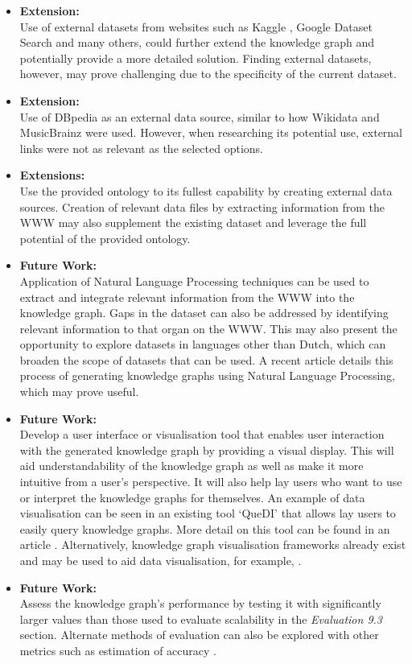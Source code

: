 \begin{itemize}
    \item \textbf{Extension:} \\ Use of external datasets from websites such as Kaggle \cite{kaggle}, Google Dataset Search \cite{googledatasetsearch} and many others, could further extend the knowledge graph and potentially provide a more detailed solution. Finding external datasets, however, may prove challenging due to the specificity of the current dataset. 
    \item \textbf{Extension:} \\ Use of DBpedia \cite{organdbpedia} as an external data source, similar to how Wikidata and MusicBrainz were used. However, when researching its potential use, external links were not as relevant as the selected options. 
    \item \textbf{Extensions:} \\ Use the provided ontology to its fullest capability by creating external data sources. Creation of relevant data files by extracting information from the WWW may also supplement the existing dataset and leverage the full potential of the provided ontology. 
    \item \textbf{Future Work:} \\ Application of Natural Language Processing techniques can be used to extract and integrate relevant information from the WWW into the knowledge graph. Gaps in the dataset can also be addressed by identifying relevant information to that organ on the WWW. This may also present the opportunity to explore datasets in languages other than Dutch, which can broaden the scope of datasets that can be used. A recent article \cite{DESSI2021253} details this process of generating knowledge graphs using Natural Language Processing, which may prove useful. 
    \item \textbf{Future Work:} \\ Develop a user interface or visualisation tool that enables user interaction with the generated knowledge graph by providing a visual display. This will aid understandability of the knowledge graph as well as make it more intuitive from a user's perspective. It will also help lay users who want to use or interpret the knowledge graphs for themselves. An example of data visualisation can be seen in an existing tool `QueDI' that allows lay users to easily query knowledge graphs. More detail on this tool can be found in an article \cite{de2020quedi}. Alternatively, knowledge graph visualisation frameworks already exist and may be used to aid data visualisation, for example, \cite{9355442}.
    \item \textbf{Future Work:} \\ Assess the knowledge graph's performance by testing it with significantly larger values than those used to evaluate scalability in the \textit{Evaluation 9.3} section. Alternate methods of evaluation can also be explored with other metrics such as estimation of accuracy \cite{gao2019efficient}.
\end{itemize}

